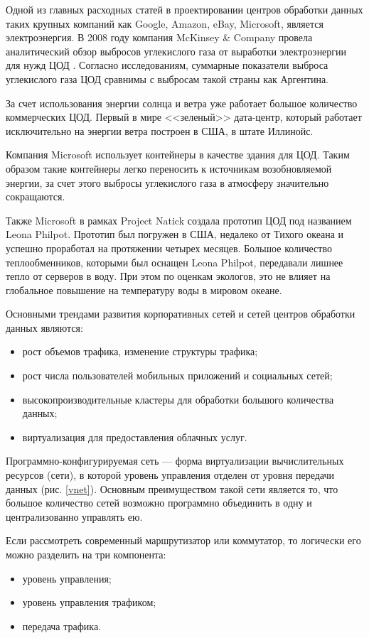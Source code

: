 Одной из главных расходных статей в проектировании центров обработки данных таких крупных компаний как Google, Amazon, eBay, Microsoft, является электроэнергия.
В 2008 году компания McKinsey \& Company провела аналитический обзор выбросов углекислого газа от выработки электроэнергии для нужд ЦОД \cite{greendc}.
Согласно исследованиям, суммарные показатели выброса углекислого газа ЦОД сравнимы с выбросам такой страны как Аргентина.

За счет использования энергии солнца и ветра уже работает большое количество коммерческих ЦОД.
Первый в мире <<зеленый>> дата-центр, который работает исключительно на энергии ветра построен в США, в штате Иллинойс.

Компания Microsoft использует контейнеры в качестве здания для ЦОД.
Таким образом такие контейнеры легко переносить к источникам возобновляемой энергии, за счет этого выбросы углекислого газа в атмосферу значительно сокращаются.

Также Microsoft в рамках Project Natick создала прототип ЦОД под названием Leona Philpot.
Прототип был погружен в США, недалеко от Тихого океана и успешно проработал на протяжении четырех месяцев.
Большое количество теплообменников, которыми был оснащен Leona Philpot, передавали лишнее тепло от серверов в воду.
При этом по оценкам экологов, это не влияет на глобальное повышение на температуру воды в мировом океане.

Основными трендами развития корпоративных сетей и сетей центров обработки данных являются:
\begin{itemize}
  \item рост объемов трафика, изменение структуры трафика;
  \item рост числа пользователей мобильных приложений и социальных сетей;
  \item высокопроизводительные кластеры для обработки большого количества данных;
  \item виртуализация для предоставления облачных услуг.
\end{itemize}

Программно-конфигурируемая сеть --- форма виртуализации вычислительных ресурсов (сети), в которой уровень управления отделен от уровня передачи данных (рис. \ref{vnet}).
Основным преимуществом такой сети является то, что большое количество сетей возможно программно объединить в одну и централизованно управлять ею.


Если рассмотреть современный маршрутизатор или коммутатор, то логически его можно разделить на три компонента:
\begin{itemize}
  \item уровень управления;
  \item уровень управления трафиком;
  \item передача трафика.
\end{itemize}

